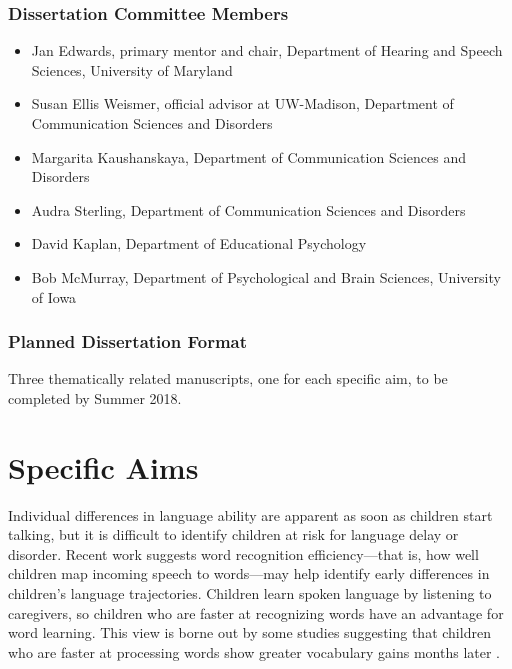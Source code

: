 \documentclass[]{book}
\providecommand{\tightlist}{%
  \setlength{\itemsep}{0pt}\setlength{\parskip}{0pt}}
\theoremstyle{definition}
\theoremstyle{definition}
\theoremstyle{remark}
\begin{document}
\subsection*{Dissertation Committee
Members}\label{dissertation-committee-members}

\begin{itemize}
\tightlist
\item
  Jan Edwards, primary mentor and chair, Department of Hearing and
  Speech Sciences, University of Maryland
\item
  Susan Ellis Weismer, official advisor at UW-Madison, Department of
  Communication Sciences and Disorders
\item
  Margarita Kaushanskaya, Department of Communication Sciences and
  Disorders
\item
  Audra Sterling, Department of Communication Sciences and Disorders
\item
  David Kaplan, Department of Educational Psychology
\item
  Bob McMurray, Department of Psychological and Brain Sciences,
  University of Iowa
\end{itemize}

\subsection*{Planned Dissertation
Format}\label{planned-dissertation-format}

Three thematically related manuscripts, one for each specific aim, to be
completed by Summer 2018.

\chapter{Specific Aims}\label{specific-aims}

Individual differences in language ability are apparent as soon as
children start talking, but it is difficult to identify children at risk
for language delay or disorder. Recent work suggests word recognition
efficiency---that is, how well children map incoming speech to
words---may help identify early differences in children's language
trajectories. Children learn spoken language by listening to caregivers,
so children who are faster at recognizing words have an advantage for
word learning. This view is borne out by some studies suggesting that
children who are faster at processing words show greater vocabulary
gains months later \citep[e.g.,][]{Weisleder2013}.
\end{document}
